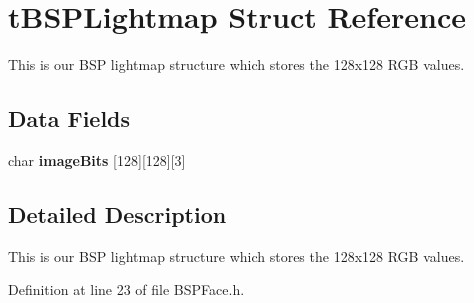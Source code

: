 \hypertarget{structt_b_s_p_lightmap}{}\section{t\+B\+S\+P\+Lightmap Struct Reference}
\label{structt_b_s_p_lightmap}


This is our B\+SP lightmap structure which stores the 128x128 R\+GB values.  


\subsection*{Data Fields}
\begin{DoxyCompactItemize}
\item 
char {\bfseries image\+Bits} \mbox{[}128\mbox{]}\mbox{[}128\mbox{]}\mbox{[}3\mbox{]}\hypertarget{structt_b_s_p_lightmap_aa06c1426bcd49921ecc14e8756ee04af}{}\label{structt_b_s_p_lightmap_aa06c1426bcd49921ecc14e8756ee04af}

\end{DoxyCompactItemize}


\subsection{Detailed Description}
This is our B\+SP lightmap structure which stores the 128x128 R\+GB values. 

Definition at line 23 of file B\+S\+P\+Face.\+h.

